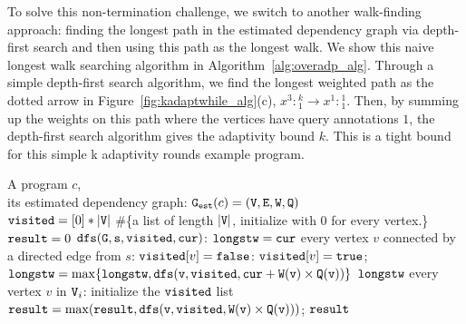 To solve this non-termination challenge, we switch to another walk-finding approach:
finding the longest path in the estimated dependency graph via depth-first search and then using this path as the longest walk.
We show this naive longest walk searching algorithm in Algorithm~\ref{alg:overadp_alg}.
Through a simple depth-first search algorithm, we find the longest weighted path as the dotted arrow in Figure~\ref{fig:kadaptwhile_alg}(c),
$x^3: {}^k_1 \to x^1: {}^1_1 $.
Then, by summing up the weights on this path where the vertices have query annotations $1$, the depth-first search algorithm gives the adaptivity bound $k$.
This is a tight bound for this simple k adaptivity rounds example program.
\begin{algorithm}
 \caption{
 {Naive Adaptivity Computation {$\kw{\pathsearch_{naive}(c, \progG(c))}$}}
 \label{alg:overadp_alg}
 }
 \begin{algorithmic}[1]
 \REQUIRE A program $c$,
 \\
 its estimated dependency graph: $\mathtt{{G_{est}}}(c) = (\mathtt{V}, \mathtt{E}, \mathtt{W}, \mathtt{Q})$
 \\ $\mathtt{visited} = [0]*|\mathtt{V}|$ \#\{a list of length $|\mathtt{V}|$, initialize with $0$ for every vertex.\}
 \\ $\mathtt{result} = 0$
  {$\mathtt{dfs(G, s, visited, cur)}$}:
 \STATE \qquad $\mathtt{longstw = cur}$
 \STATE {} every vertex $v$ 
 connected by a directed edge from $s$:
 \STATE \qquad {} $\mathtt{visited}[v] = \mathtt{false}$:
 \STATE \qquad \qquad \qquad $\mathtt{visited}[v] = \mathtt{true}$; %
 \STATE \qquad \qquad \qquad $\mathtt{longstw} = \max\{\mathtt{longstw}, \mathtt{dfs(v, visited, cur + \mathtt{W}(v)\times \mathtt{Q}(v))} \}$
 \STATE {} $\mathtt{longstw}$
  every vertex $v$ in $\mathtt{V}_i$:
 \STATE \qquad initialize the $\mathtt{visited}$ list
 \STATE \qquad $\mathtt{result = \max(result, dfs(v, \mathtt{visited}, \mathtt{W}(v)\times \mathtt{Q}(v)))}$; 
 \RETURN $\mathtt{result}$
 \end{algorithmic}
 \end{algorithm}

